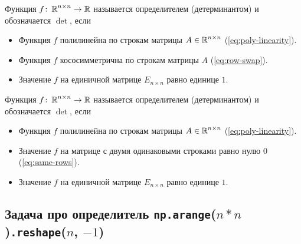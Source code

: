 \documentclass[a4paper,12pt]{article}
\begin{document}
  \begin{definition}
    Функция $f \colon \operatorname{\mathbb R}^{n \times n} \to \operatorname{\mathbb R}$ называется определителем (детерминантом) и обозначается $\det$, если
    \begin{itemize}
      \item Функция $f$ полилинейна по строкам матрицы $A \in \operatorname{\mathbb R}^{n \times n}$ (\ref{eq:poly-linearity}).
      \item Функция $f$ кососимметрична по строкам матрицы $A$ (\ref{eq:row-swap}).
      \item Значение $f$ на единичной матрице $E_{n \times n}$ равно единице $1$.
    \end{itemize}
  \end{definition}
  
  \begin{definition}
    Функция $f \colon \operatorname{\mathbb R}^{n \times n} \to \operatorname{\mathbb R}$ называется определителем (детерминантом) и обозначается $\det$, если
    \begin{itemize}
      \item Функция $f$ полилинейна по строкам матрицы $A \in \operatorname{\mathbb R}^{n \times n}$ (\ref{eq:poly-linearity}).
      \item Значение $f$ на матрице с двумя одинаковыми строками равно нулю $0$ (\ref{eq:same-rows}).
      \item Значение $f$ на единичной матрице $E_{n \times n}$ равно единице $1$.
    \end{itemize}
  \end{definition}
  
  
  \subsection{Задача про определитель \texttt{np.arange}($n * n$)\texttt{.reshape}($n$, $-1$)}
  
\end{document}
